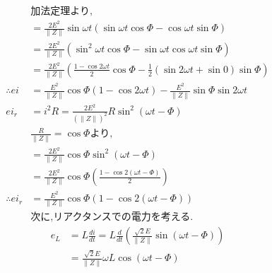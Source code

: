 \documentclass[twocolumn]{article}
\begin{document}
\begin{enumerate}
\begin{align*}
                          & \text{加法定理より,}                                                                                                                           \\
                          & = \frac{2E^2}{\|Z\|}\sin\omega t \left( \sin \omega t \cos \Phi - \cos \omega t \sin \Phi \right)                                        \\
                          & = \frac{2E^2}{\|Z\|} \left( \sin^2\omega t \cos \Phi - \sin \omega t \cos \omega t \sin \Phi \right)                                     \\
                          & = \frac{2E^2}{\|Z\|} \left( \frac{1 - \cos 2 \omega t}{2} \cos \Phi - \frac{1}{2} \left( \sin2\omega t  + \sin 0\right)\sin \Phi \right) \\
          \therefore ei   & = \frac{E^2}{\|Z\|} \cos \Phi \left(1-\cos2\omega t\right) - \frac{E^2}{\|Z\|} \sin\Phi \sin 2 \omega t                                  \\
          ei_r            & = i^2 R = \frac{2E^2}{(\|Z\|)^2}R\sin^2\left(\omega t -\Phi\right)                                                                       \\
                          & \frac{R}{\|Z\|} = \cos \Phi\text{より,}                                                                                                    \\
                          & = \frac{2E^2}{\|Z\|} \cos \Phi \sin^2\left(\omega t - \Phi\right)                                                                        \\
                          & = \frac{2E^2}{\|Z\|} \cos \Phi \left( \frac{1 - \cos 2 \left(\omega t - \Phi\right)}{2} \right)                                          \\
          \therefore ei_r & = \frac{E^2}{\|Z\|} \cos \Phi \left( 1 - \cos 2 \left(\omega t - \Phi\right)\right)                                                      \\
                          & \text{次に,リアクタンスでの電力を考える.}
        \end{align*}
        \begin{align*}
          e_L             & = L \frac{di}{dt} = L \frac{d}{dt} \left( \frac{\sqrt{2}E}{\|Z\|}\sin \left( \omega t - \Phi\right)\right)                          \\
                          & = \frac{\sqrt{2}E}{\|Z\|}\omega L \cos \left(\omega t - \Phi\right)                                                                 \\

\end{align*}
\end{enumerate}
\end{document}
